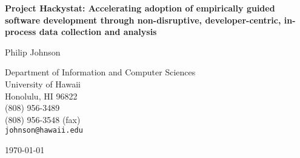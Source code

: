 \begin{titlepage}
\vspace*{1in}
\begin{center}
   
\Large


{\bf Project Hackystat: Accelerating adoption of empirically guided software development through
  non-disruptive, developer-centric, in-process data collection and analysis}

\bigskip

\normalsize

Philip Johnson                           \medskip\par
Department of Information and Computer Sciences\\ 
University of Hawaii\\ 
Honolulu, HI 96822\\                       
(808) 956-3489\\
(808) 956-3548 (fax)\\
{\tt johnson@hawaii.edu}                 \bigskip\par

\today                                   \bigskip\par



\end{center}
\end{titlepage}
